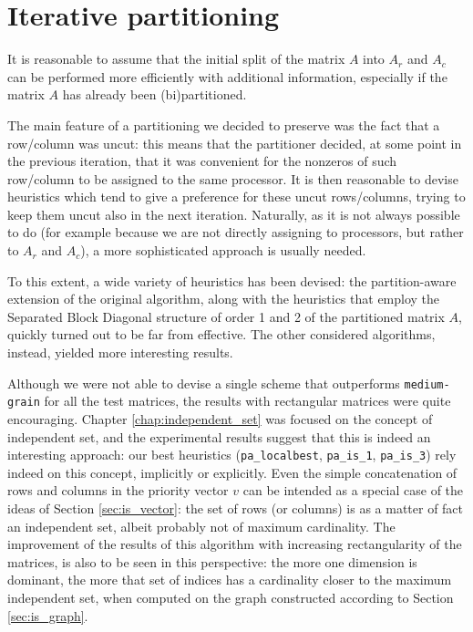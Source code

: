 \section{Iterative partitioning} \label{sec:conclusions_pa}

It is reasonable to assume that the initial split of the matrix $A$ into $A_r$ and $A_c$ can be performed more efficiently with additional information, especially if the matrix $A$ has already been (bi)partitioned.

The main feature of a partitioning we decided to preserve was the fact that a row/column was uncut: this means that the partitioner decided, at some point in the previous iteration, that it was convenient for the nonzeros of such row/column to be assigned to the same processor. It is then reasonable to devise heuristics which tend to give a preference for these uncut rows/columns, trying to keep them uncut also in the next iteration. Naturally, as it is not always possible to do (for example because we are not directly assigning to processors, but rather to $A_r$ and $A_c$), a more sophisticated approach is usually needed.

To this extent, a wide variety of heuristics has been devised: the partition-aware extension of the original algorithm, along with the heuristics that employ the Separated Block Diagonal structure of order 1 and 2 of the partitioned matrix $A$, quickly turned out to be far from effective. The other considered algorithms, instead, yielded more interesting results.

Although we were not able to devise a single scheme that outperforms \verb|medium-grain| for all the test matrices, the results with rectangular matrices were quite encouraging. Chapter \ref{chap:independent_set} was focused on the concept of independent set, and the experimental results suggest that this is indeed an interesting approach: our best heuristics (\verb|pa_localbest|, \verb|pa_is_1|, \verb|pa_is_3|) rely indeed on this concept, implicitly or explicitly. Even the simple concatenation of rows and columns in the priority vector $v$ can be intended as a special case of the ideas of Section \ref{sec:is_vector}: the set of rows (or columns) is as a matter of fact an independent set, albeit probably not of maximum cardinality. The improvement of the results of this algorithm with increasing rectangularity of the matrices, is also to be seen in this perspective: the more one dimension is dominant, the more that set of indices has a cardinality closer to the maximum independent set, when computed on the graph constructed according to Section \ref{sec:is_graph}.

